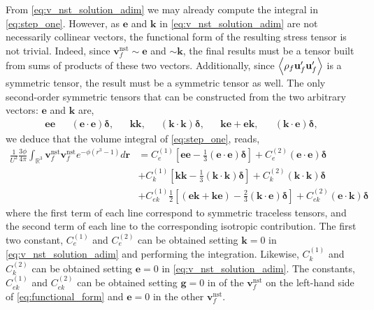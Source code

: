 From \ref{eq:v_nst_solution_adim} we may already compute the integral in \ref{eq:step_one}. 
However, as $\textbf{e}$ and $\textbf{k}$ in \ref{eq:v_nst_solution_adim}  are not necessarily collinear vectors, the functional form of the resulting stress tensor is not trivial. 
Indeed, since $\textbf{v}_f^\text{nst}\sim \textbf{e}$ and $\sim \textbf{k}$, the final results must be a tensor built from sums of products of these two vectors.  
Additionally, since $\left<\rho_f \textbf{u}_f'\textbf{u}_f'\right>$ is a symmetric tensor, the result must be a symmetric tensor as well. 
The only second-order symmetric tensors that can be constructed from the  two arbitrary vectors: $\textbf{e}$ and $\textbf{k}$ are, 
\begin{align*}
    \textbf{ee}
    && (\textbf{e}\cdot \textbf{e})\bm\delta, 
    && \textbf{kk},
    && (\textbf{k}\cdot \textbf{k})\bm\delta,
    && \textbf{ke}+\textbf{ek},
    && (\textbf{k}\cdot \textbf{e})\bm\delta, 
\end{align*}
we deduce that the volume integral of \ref{eq:step_one}, reads, 
\begin{align}
    \frac{1}{U^2}
    \frac{3\phi}{4\pi}\int_{\mathbb{R}^3}
    \textbf{v}_f^\text{nst}
    \textbf{v}_f^\text{nst}
     e^{-\phi(r^3 -1)}
    d\textbf{r}
    &= C^{(1)}_e \left[
        \textbf{ee}
         - \frac{1}{3}(\textbf{e}\cdot \textbf{e})\bm\delta
    \right]
    + C^{(2)}_e 
    (\textbf{e}\cdot \textbf{e})\bm\delta \nonumber \\
    &+ C^{(1)}_k \left[
        \textbf{kk}
         - \frac{1}{3}(\textbf{k}\cdot \textbf{k})\bm\delta
    \right]
    + C^{(2)}_k 
    (\textbf{k}\cdot \textbf{k})\bm\delta \nonumber \\
    &+ C^{(1)}_{ek} \frac{1}{2}\left[
        (\textbf{ek}  + \textbf{ke})
         - \frac{2}{3}(\textbf{k}\cdot \textbf{e})\bm\delta
    \right]
    + C^{(2)}_{ek} 
    (\textbf{e}\cdot \textbf{k})\bm\delta 
    \label{eq:functional_form}
\end{align}
where the first term of each line correspond to symmetric traceless tensors, and the second term of each line to the corresponding isotropic contribution. 
The first two constant, $C^{(1)}_e$ and $C^{(2)}_e$ can be obtained setting $\textbf{k}= 0$ in \ref{eq:v_nst_solution_adim} and performing the integration. 
Likewise, $C^{(1)}_k$ and $C^{(2)}_k$ can be obtained setting $\textbf{e}=0$ in \ref{eq:v_nst_solution_adim}. 
The constants, $C^{(1)}_{ek}$ and $C^{(2)}_{ek}$ can be obtained setting $\textbf{g} = 0$ in of the $\textbf{v}_f^\text{nst}$ on the left-hand side of \ref{eq:functional_form} and $\textbf{e}=0$ in the other $\textbf{v}_f^\text{nst}$. 
